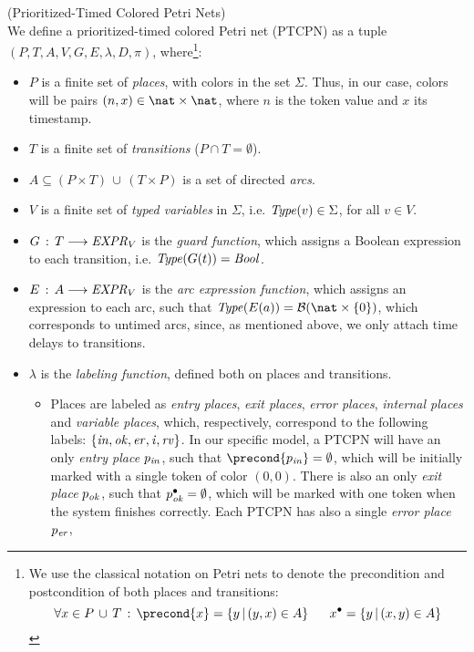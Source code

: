 \bdfn (Prioritized-Timed Colored Petri Nets)\\
We define a prioritized-timed colored Petri net (PTCPN)
as a tuple \linebreak 
$(P,T,A,V,G,E,\lambda,D,\pi)$, where\footnote{
We use the classical notation on Petri nets to denote the
precondition and postcondition of both places and transitions:
%
\[ \forall x \in P\,\cup\,T\,:\,
\precond{x} = \{ y \,|\, (y,x) \in A\}~~~~~
   x^{\bullet} = \{ y \,|\, (x,y) \in A\}
\]
}:
%
\begin{itemize}
\item $P$ is a finite set of {\em places}, with colors
in the set $\Sigma$. Thus, in our case, colors 
will be pairs $(n,x)\in \nat \times \nat$, where $n$ is
the token value and $x$ its timestamp.
%
\item $T$ is a finite set of {\em transitions} ($P\cap T = \emptyset$).
%
\item $A \subseteq (P\times T)\,\cup\,(T \times P)$ is a
set of directed {\em arcs}.
%
%
\item $V$ is a finite set of {\em typed variables} in $\Sigma$, 
i.e. ${\it Type}(v) \in \Sigma$, for all $v \in V$.
%
%
\item $G\,:\, T \longrightarrow {\it EXPR}_V$ is the
{\em guard function}, which assigns a Boolean
expression
to each transition, i.e. ${\it Type}(G(t))={\it Bool}$. 
%
\item $E\,:\, A \longrightarrow {\it EXPR}_V$ is the
{\em arc expression function}, which assigns an expression
to each arc, such that ${\it Type}(E(a)) = {\cal B}(\nat \times \{0\})$,
which corresponds to untimed arcs, since, as mentioned above,
we only attach time delays to transitions.
%
%
\item $\lambda$ is the {\em labeling function}, defined
both on places and transitions.
%
\begin{itemize}
\item Places are labeled as
{\em entry places}, {\em exit places}, {\em error places},
{\em internal places} and {\em variable places},
which, respectively, correspond to the following labels:
$\{{\it in, ok, er, i, rv}\}$. In our specific model, a 
PTCPN will have an only {\em entry place} $p_{\it in}$, 
such that $\precond{p_{\it in}} = \emptyset$,
which will be
initially marked with a single token of color $(0,0)$. 
There is also
an only {\em exit place} $p_{\it ok}$, such that
$p^{\bullet}_{\it ok}=\emptyset$, which will be marked with 
one token when the system finishes correctly. Each PTCPN
has also a single {\em error place} $p_{\it er}$,

\end{itemize}
\end{itemize}
